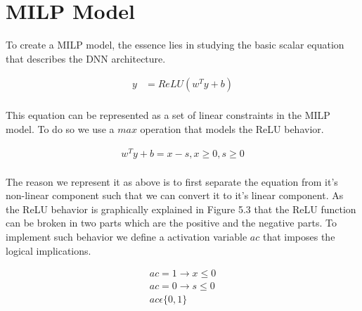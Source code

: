 \section{MILP Model}
To create a \ac{MILP} model, the essence lies in studying the basic scalar equation that describes the \ac{DNN} architecture. 

\begin{equation}
\begin{aligned}
y &= ReLU(w^Ty + b) \\
\end{aligned}
\end{equation}

This equation can be represented as a set of linear constraints in the \ac{MILP} model. 
To do so we use a $max$ operation that models the ReLU behavior. 

\begin{equation}
\begin{aligned}
w^Ty + b = x - s, x \geq 0, s \geq 0 \\
\end{aligned}
\end{equation}

The reason we represent it as above is to first separate the equation from it's non-linear component such that we can convert it to it's linear component. 
As the ReLU behavior is graphically explained in Figure 5.3 that the ReLU function can be broken in two parts which are the positive and the negative parts.  
To implement such behavior we define a activation variable $ac$ that imposes the logical implications. 

\begin{equation}
\begin{aligned}
ac =  1 \rightarrow x \leq 0  \\
ac =  0 \rightarrow s \leq 0  \\
ac \epsilon  \{0,1\} \\
\end{aligned}
\end{equation}

